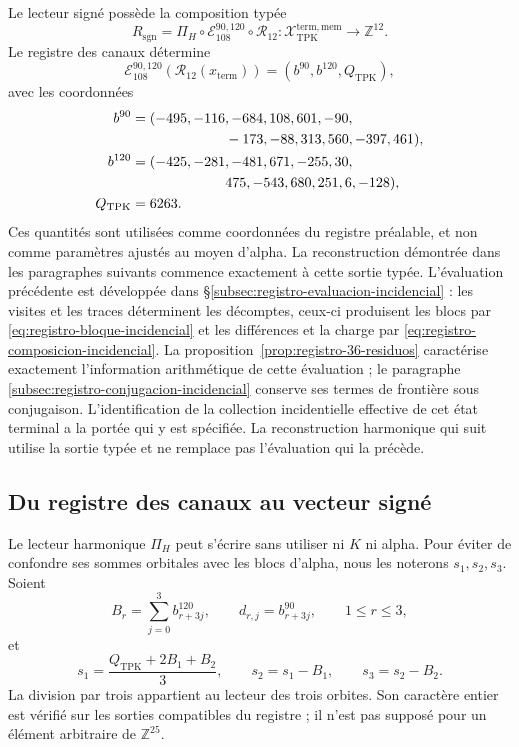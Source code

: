 Le lecteur signé possède la composition typée
\begin{equation}
 R_{\mathrm{sgn}}
 =\Pi_H\circ\mathcal E_{108}^{90,120}\circ\mathcal R_{12}:
 \mathcal X_{\mathrm{TPK}}^{\mathrm{term,mem}}
 \longrightarrow\mathbb Z^{12}.
 \label{eq:k-lector-firmado}
\end{equation}
Le registre des canaux détermine
\[
 \mathcal E_{108}^{90,120}(\mathcal R_{12}(x_{\mathrm{term}}))
 =(b^{90},b^{120},Q_{\mathrm{TPK}}),
\]
avec les coordonnées
\begin{align*}
 b^{90}={}&(-495,-116,-684,108,601,-90,\\
            &\hspace{19mm}-173,-88,313,560,-397,461),\\
 b^{120}={}&(-425,-281,-481,671,-255,30,\\
             &\hspace{19mm}475,-543,680,251,6,-128),\\
 Q_{\mathrm{TPK}}={}&6263.
\end{align*}
Ces quantités sont utilisées comme coordonnées du registre préalable, et non
comme paramètres ajustés au moyen d’alpha. La reconstruction démontrée
dans les paragraphes suivants commence exactement à cette sortie typée.
L’évaluation précédente est développée dans
\S\ref{subsec:registro-evaluacion-incidencial} : les visites et les traces
déterminent les décomptes, ceux-ci produisent les blocs par
\eqref{eq:registro-bloque-incidencial} et les différences et la charge par
\eqref{eq:registro-composicion-incidencial}. La
proposition~\ref{prop:registro-36-residuos} caractérise exactement
l’information arithmétique de cette évaluation ; le paragraphe
\ref{subsec:registro-conjugacion-incidencial} conserve ses termes de
frontière sous conjugaison. L’identification de la collection incidentielle
effective de cet état terminal a la portée qui y est spécifiée.
La reconstruction harmonique qui suit utilise la sortie typée et ne
remplace pas l’évaluation qui la précède.

\subsection{Du registre des canaux au vecteur signé}
\label{subsec:k-pi-h}

Le lecteur harmonique \(\Pi_H\) peut s'écrire sans utiliser ni \(K\) ni
alpha. Pour éviter de confondre ses sommes orbitales avec les blocs d'alpha,
nous les noterons \(s_1,s_2,s_3\). Soient
\[
 B_r=\sum_{j=0}^{3}b^{120}_{r+3j},\qquad
 d_{r,j}=b^{90}_{r+3j},\qquad1\leq r\leq3,
\]
et
\begin{equation}
 s_1=\frac{Q_{\mathrm{TPK}}+2B_1+B_2}{3},\qquad
 s_2=s_1-B_1,\qquad s_3=s_2-B_2.
 \label{eq:k-sumas-armonicas}
\end{equation}
La division par trois appartient au lecteur des trois orbites. Son caractère entier est vérifié sur les sorties compatibles du registre ; il n'est pas supposé pour un élément arbitraire de \(\mathbb Z^{25}\).

